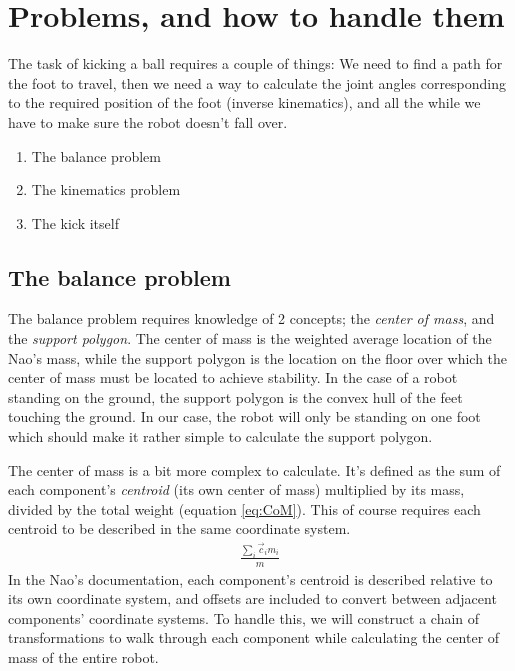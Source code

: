 \documentclass[a4paper]{article}
\begin{document}
\section{Problems, and how to handle them}
The task of kicking a ball requires a couple of things: We need to find a path
for the foot to travel, then we need a way to calculate the joint angles
corresponding to the required position of the foot (inverse kinematics), and all
the while we have to make sure the robot doesn’t fall over.

\begin{enumerate}
  \item The balance problem
  \item The kinematics problem
  \item The kick itself
\end{enumerate}

\subsection{The balance problem}
The balance problem requires knowledge of 2 concepts; the \emph{center of mass},
and the \emph{support polygon}. The center of mass is the weighted average
location of the Nao’s mass, while the support polygon is the location on the
floor over which the center of mass must be located to achieve stability. In the
case of a robot standing on the ground, the support polygon is the convex hull
of the feet touching the ground. In our case, the robot will only be standing on
one foot which should make it rather simple to calculate the support polygon. 

The center of mass is a bit more complex to calculate. It’s defined as the sum
of each component’s \emph{centroid} (its own center of mass) multiplied by its
mass, divided by the total weight (equation \ref{eq:CoM}). This of course
requires each centroid to be described in the same coordinate system.
\begin{align}
  \frac{\sum_i \vec{c}_i m_i} {m}        \label{eq:CoM}
\end{align}
In the Nao’s documentation, each component’s centroid is described relative to
its own coordinate system, and offsets are included to convert between adjacent
components’ coordinate systems. To handle this, we will construct a chain of
transformations to walk through each component while calculating the center of
mass of the entire robot.
\end{document}
